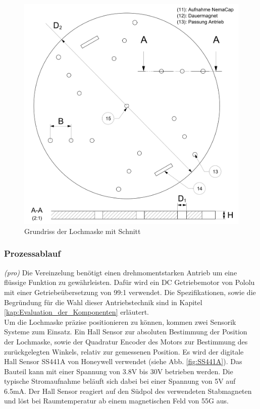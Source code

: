 	\begin{figure}[H]
	\includegraphics[scale=0.75]{Illustrationen/6-Umsetzung/detail_lochmaske.jpg}
	\caption{Grundriss der Lochmaske mit Schnitt}
	\label{fig:detail_lochmaske}
	\end{figure}

\subsubsection{Prozessablauf}
\textit{(pro)} Die Vereinzelung benötigt einen drehmomentstarken Antrieb um eine flüssige Funktion zu gewährleisten. Dafür wird ein DC Getriebemotor von Pololu mit einer Getriebeübersetzung von 99:1 verwendet. Die Spezifikationen, sowie die Begründung für die Wahl dieser Antriebstechnik sind in Kapitel \ref{kap:Evaluation_der_Komponenten} erläutert.
\\ Um die Lochmaske präzise positionieren zu können, kommen zwei Sensorik Systeme zum Einsatz. Ein Hall Sensor zur absoluten Bestimmung der Position der Lochmaske, sowie der Quadratur Encoder des Motors zur Bestimmung des zurückgelegten Winkels, relativ zur gemessenen Position. Es wird der digitale Hall Sensor SS441A von Honeywell verwendet (siehe Abb. \ref{fig:SS441A}). Das Bauteil kann mit einer Spannung von 3.8V bis 30V betrieben werden. Die typische Stromaufnahme beläuft sich dabei bei einer Spannung von 5V auf 6.5mA. Der Hall Sensor reagiert auf den Südpol des verwendeten Stabmagneten und löst bei Raumtemperatur ab einem magnetischen Feld von 55G aus.

